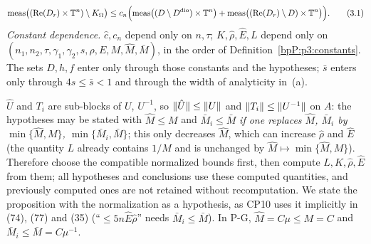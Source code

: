 \begin{proposition}
\[\operatorname{meas}\bigl((\operatorname{Re}(D_r)\times\mathbb{T}^n)\setminus K_\Omega\bigr)\le c_n\Bigl(\operatorname{meas}\bigl((D\setminus D^{\rm dio})\times\mathbb{T}^n\bigr)+\operatorname{meas}\bigl((\operatorname{Re}(D_r)\setminus D)\times\mathbb{T}^n\bigr)\Bigr).\tag{3.1}\]
\emph{Constant dependence.} $\hat c,c_n$ depend only on $n,\tau$; $K,\hat\rho,\hat E,L$ depend only on $(n_1,n_2,\tau,\gamma_1,\gamma_2,s,\rho,E,M,\hat M,\bar M)$, in the order of Definition~\ref{bpP:p3:constants}.
The sets $D,h,f$ enter only through those constants and the hypotheses; $\bar s$ enters only through $4s\le\bar s<1$ and through the width of analyticity in~(a).
\par{}
\end{proposition}

\begin{remark}\label{bpP:p3:rem-norm}
$\hat U$ and $T_i$ are sub-blocks of $U$, $U^{-1}$, so $\lVert \hat U\rVert\le\lVert U\rVert$ and $\lVert T_i\rVert\le\lVert U^{-1}\rVert$ on $A$: the hypotheses may be stated with $\hat M\le M$ and $\bar M_i\le\bar M$ \emph{if one replaces
$\hat M$, $\bar M_i$ by $\min\{\hat M,M\}$, $\min\{\bar M_i,\bar M\}$}; this only decreases $\hat M$, which can increase $\hat\rho$ and $\hat E$ (the quantity $L$ already contains $1/M$ and is unchanged by $\hat M\mapsto\min\{\hat M,M\}$). Therefore choose the compatible normalized bounds first, then compute $L,K,\hat\rho,\hat E$ from them; all hypotheses and conclusions use these computed quantities, and previously computed ones are not retained without recomputation. We state the proposition with the normalization
as a hypothesis, as CP10 uses it implicitly in (74), (77) and (35) (``$\le5n\hat E\hat\rho$'' needs $\bar M_i\le\bar M$). In P-G, $\hat M=C\mu\le M=C$ and $\bar M_i\le\bar M=C\mu^{-1}$.
\end{remark}

